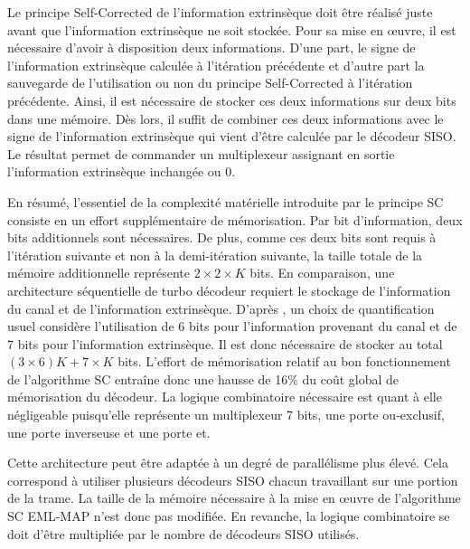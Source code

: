 Le principe Self-Corrected de l’information extrinsèque doit être réalisé juste avant que l'information extrinsèque ne soit stockée. 
Pour sa mise en œuvre, il est nécessaire d'avoir à disposition deux informations. D'une part, le signe de l'information 
extrinsèque calculée à l'itération précédente et d'autre part la sauvegarde de l'utilisation ou non du principe Self-Corrected à 
l'itération précédente. Ainsi, il est nécessaire de stocker ces deux informations sur deux bits dans une mémoire. Dès lors, 
il suffit de combiner ces deux informations avec le signe de l'information extrinsèque qui vient d'être 
calculée par le décodeur SISO. Le résultat permet de commander un multiplexeur assignant en sortie l'information extrinsèque 
inchangée ou 0.

En résumé, l'essentiel de la complexité matérielle introduite par le principe SC consiste en un effort supplémentaire de mémorisation. Par bit 
d'information, deux bits additionnels sont nécessaires. De plus, comme ces deux bits sont 
requis à l'itération suivante et non à la demi-itération suivante, la taille totale de la mémoire additionnelle 
représente $2 \times 2 \times K$ bits. En comparaison, une architecture séquentielle de turbo décodeur requiert le stockage
de  l'information du canal et de l'information extrinsèque. D'après \cite{livre_declercq}, un choix de quantification 
usuel considère l'utilisation de 6 bits pour l'information provenant du canal et de 7 bits pour l'information extrinsèque.
Il est donc nécessaire de stocker au total $(3\times 6)K + 7\times K$ bits. L'effort de mémorisation relatif au bon 
fonctionnement de l'algorithme SC entraîne donc une hausse de 16\% du coût global de mémorisation du décodeur.
La logique combinatoire nécessaire est quant à elle négligeable puisqu'elle
représente un multiplexeur 7 bits, une porte ou-exclusif, une porte inverseuse et une porte et.

Cette architecture peut être adaptée à un degré de parallélisme plus élevé. Cela correspond à utiliser plusieurs décodeurs SISO chacun 
travaillant sur une portion de la trame. La taille de la mémoire nécessaire à la mise en œuvre de l'algorithme SC EML-MAP n'est donc pas modifiée. En revanche, la logique combinatoire
se doit d'être multipliée par le nombre de décodeurs SISO utilisés.


